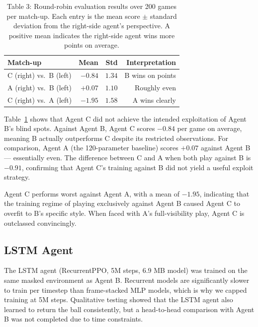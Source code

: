 \documentclass[conference]{IEEEtran}
\begin{document}
\begin{table}[h]
\caption{Table 3: Round-robin evaluation results over 200 games per match-up. Each entry is the mean score $\pm$ standard deviation from the right-side agent's perspective. A positive mean indicates the right-side agent wins more points on average.}
\label{tab:roundrobin}
\begin{center}
\begin{tabular}{|l|r|r|r|}
\hline
\textbf{Match-up} & \textbf{Mean} & \textbf{Std} & \textbf{Interpretation} \\
\hline
C (right) vs.\ B (left) & $-0.84$ & $1.34$ & B wins on points \\
\hline
A (right) vs.\ B (left) & $+0.07$ & $1.10$ & Roughly even \\
\hline
C (right) vs.\ A (left) & $-1.95$ & $1.58$ & A wins clearly \\
\hline
\end{tabular}
\end{center}
\end{table}

Table~\ref{tab:roundrobin} shows that Agent C did not achieve the intended exploitation of Agent B's blind spots. Against Agent B, Agent C scores $-0.84$ per game on average, meaning B actually outperforms C despite its restricted observations. For comparison, Agent A (the 120-parameter baseline) scores $+0.07$ against Agent B --- essentially even. The difference between C and A when both play against B is $-0.91$, confirming that Agent C's training against B did not yield a useful exploit strategy.

Agent C performs worst against Agent A, with a mean of $-1.95$, indicating that the training regime of playing exclusively against Agent B caused Agent C to overfit to B's specific style. When faced with A's full-visibility play, Agent C is outclassed convincingly.

\subsection{LSTM Agent}

The LSTM agent (RecurrentPPO, 5M steps, 6.9 MB model) was trained on the same masked environment as Agent B. Recurrent models are significantly slower to train per timestep than frame-stacked MLP models, which is why we capped training at 5M steps. Qualitative testing showed that the LSTM agent also learned to return the ball consistently, but a head-to-head comparison with Agent B was not completed due to time constraints.
\end{document}
